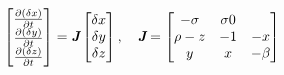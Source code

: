 \begin{align*}
  \begin{bmatrix}
    \frac{\partial (\delta x)}{\partial t} \\
    \frac{\partial (\delta y)}{\partial t} \\
    \frac{\partial (\delta z)}{\partial t}
  \end{bmatrix}
  =
  \textit{\textbf{J}}
  \begin{bmatrix}
    \delta x \\
    \delta y \\
    \delta z
  \end{bmatrix},
  \quad \textit{\textbf{J}} =
  \begin{bmatrix}
    -\sigma & \sigma 0 \\
    \rho-z & -1 & -x \\
    y & x & -\beta
  \end{bmatrix}
\end{align*}
